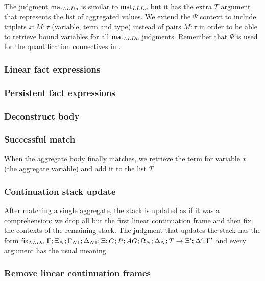 The judgment $\mathsf{mat}_{LLDa} \;$is similar to $\mathsf{mat}_{LLDc} \;$but it has the extra $T$ argument that
represents the list of aggregated values. We extend the $\Psi$ context to
include triplets $x : M : \tau$ (variable, term and type) instead of pairs $M :
\tau$ in order to be able to retrieve bound variables for all $\mathsf{mat}_{LLDa} \;$judgments.
Remember that $\Psi$ is used for the quantification connectives in \fragment.

\subsubsection{Linear fact expressions}



\subsubsection{Persistent fact expressions}



\subsubsection{Deconstruct body}



\subsubsection{Successful match}

When the aggregate body finally matches, we retrieve the term for variable $x$
(the aggregate variable) and add it to the list $T$.



\subsubsection{Continuation stack update}

After matching a single aggregate, the stack is updated as if it was a
comprehension: we drop all but the first linear continuation frame and then fix
the contexts of the remaining stack.  The judgment that updates the stack has
the form $\mathsf{fix}_{LLDa} \; \Gamma; \Xi_N; \Gamma_{N1}; \Delta_{N1}; \Xi; C; P; AG; \Omega_N;
\Delta_N; T \rightarrow \Xi'; \Delta'; \Gamma'$ and every argument has the usual
meaning.

\subsubsection{Remove linear continuation frames}

